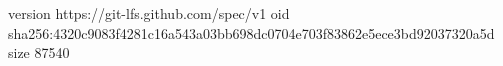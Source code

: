 version https://git-lfs.github.com/spec/v1
oid sha256:4320c9083f4281c16a543a03bb698dc0704e703f83862e5ece3bd92037320a5d
size 87540
